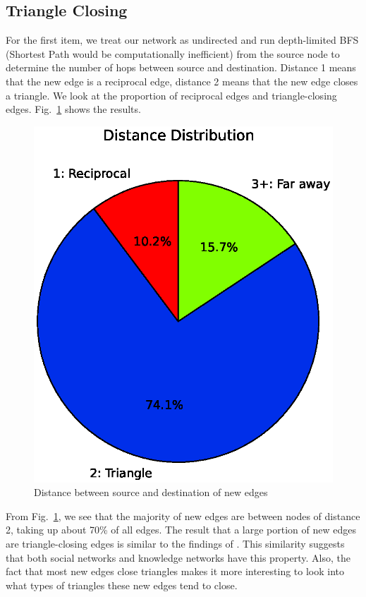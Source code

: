 \documentclass[10pt,twocolumn]{article}
\begin{document}
\subsection{Triangle Closing}
For the first item, we treat our network as undirected and run depth-limited BFS (Shortest Path would be computationally inefficient) from the source node to determine the number of hops between source and destination. Distance 1 means that the new edge is a reciprocal edge, distance 2 means that the new edge closes a triangle. We look at the proportion of reciprocal edges and triangle-closing edges. Fig.~\ref{fig:portion123} shows the results.
\begin{figure}[ht]
    \centering
    \includegraphics[scale=0.4]{./graphs/distance_pie.eps}
    \caption{Distance between source and destination of new edges} \label{fig:portion123}
\end{figure}
From Fig.~\ref{fig:portion123}, we see that the majority of new edges are between nodes of distance 2, taking up about 70\% of all edges. The result that a large portion of new edges are triangle-closing edges is similar to the findings of \cite{leskovec2008microscopic}. This similarity suggests that both social networks and knowledge networks have this property. Also, the fact that most new edges close triangles makes it more interesting to look into what types of triangles these new edges tend to close.
\end{document}
